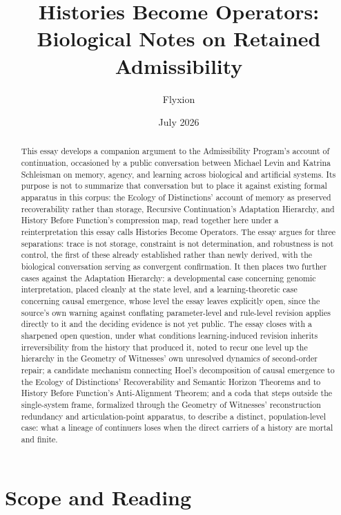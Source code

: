 \documentclass[11pt]{article}
\title{\textbf{Histories Become Operators: Biological Notes on Retained Admissibility}}
\author{Flyxion}
\date{July 2026}
\begin{document}
\maketitle

\begin{abstract}
\noindent This essay develops a companion argument to the Admissibility Program's account of continuation, occasioned by a public conversation between Michael Levin and Katrina Schleisman on memory, agency, and learning across biological and artificial systems. Its purpose is not to summarize that conversation but to place it against existing formal apparatus in this corpus: the Ecology of Distinctions' account of memory as preserved recoverability rather than storage, Recursive Continuation's Adaptation Hierarchy, and History Before Function's compression map, read together here under a reinterpretation this essay calls Histories Become Operators. The essay argues for three separations: trace is not storage, constraint is not determination, and robustness is not control, the first of these already established rather than newly derived, with the biological conversation serving as convergent confirmation. It then places two further cases against the Adaptation Hierarchy: a developmental case concerning genomic interpretation, placed cleanly at the state level, and a learning-theoretic case concerning causal emergence, whose level the essay leaves explicitly open, since the source's own warning against conflating parameter-level and rule-level revision applies directly to it and the deciding evidence is not yet public. The essay closes with a sharpened open question, under what conditions learning-induced revision inherits irreversibility from the history that produced it, noted to recur one level up the hierarchy in the Geometry of Witnesses' own unresolved dynamics of second-order repair; a candidate mechanism connecting Hoel's decomposition of causal emergence to the Ecology of Distinctions' Recoverability and Semantic Horizon Theorems and to History Before Function's Anti-Alignment Theorem; and a coda that steps outside the single-system frame, formalized through the Geometry of Witnesses' reconstruction redundancy and articulation-point apparatus, to describe a distinct, population-level case: what a lineage of continuers loses when the direct carriers of a history are mortal and finite.
\end{abstract}

\newpage

\section{Scope and Reading}
\end{document}
